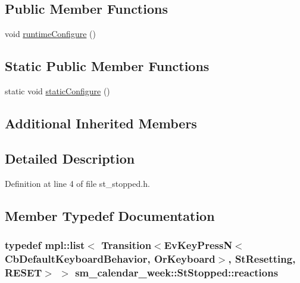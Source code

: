 \subsection*{Public Member Functions}
\begin{DoxyCompactItemize}
\item 
void \hyperlink{structsm__calendar__week_1_1StStopped_acb2386ca04853e68855069842f99717b}{runtime\+Configure} ()
\end{DoxyCompactItemize}
\subsection*{Static Public Member Functions}
\begin{DoxyCompactItemize}
\item 
static void \hyperlink{structsm__calendar__week_1_1StStopped_adc2ae5868200bfe6aa844ce56c944402}{static\+Configure} ()
\end{DoxyCompactItemize}
\subsection*{Additional Inherited Members}


\subsection{Detailed Description}


Definition at line 4 of file st\+\_\+stopped.\+h.



\subsection{Member Typedef Documentation}
\subsubsection[{\texorpdfstring{reactions}{reactions}}]{\setlength{\rightskip}{0pt plus 5cm}typedef mpl\+::list$<$ Transition$<$Ev\+Key\+PressN$<$Cb\+Default\+Keyboard\+Behavior, {\bf Or\+Keyboard}$>$, {\bf St\+Resetting}, {\bf R\+E\+S\+ET}$>$ $>$ {\bf sm\+\_\+calendar\+\_\+week\+::\+St\+Stopped\+::reactions}}\hypertarget{structsm__calendar__week_1_1StStopped_a7842bf2ad54538d22b6345d2203e69b1}{}\label{structsm__calendar__week_1_1StStopped_a7842bf2ad54538d22b6345d2203e69b1}


